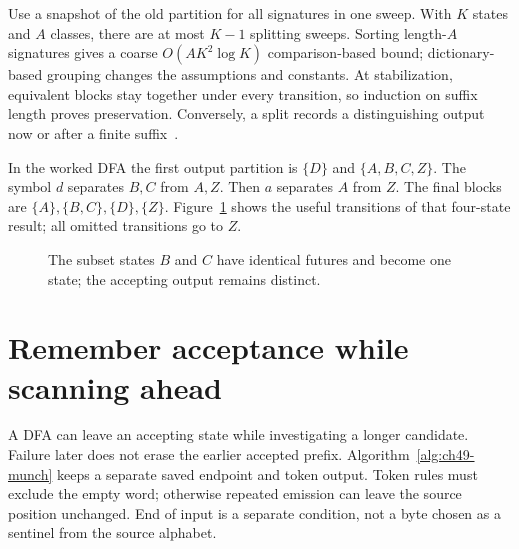 Use a snapshot of the old partition for all signatures in one sweep.
With $K$ states and $A$ classes, there are at most $K-1$ splitting sweeps.
Sorting length-$A$ signatures gives a coarse $O(AK^2\log K)$ comparison-based bound; dictionary-based grouping changes the assumptions and constants.
At stabilization, equivalent blocks stay together under every transition, so induction on suffix length proves preservation.
Conversely, a split records a distinguishing output now or after a finite suffix~\cite{hopcroft-2007-automata}.

In the worked DFA the first output partition is $\{D\}$ and $\{A,B,C,Z\}$.
The symbol $d$ separates $B,C$ from $A,Z$.
Then $a$ separates $A$ from $Z$.
The final blocks are $\{A\},\{B,C\},\{D\},\{Z\}$.
Figure~\ref{fig:ch49-minimal} shows the useful transitions of that four-state result; all omitted transitions go to $Z$.

\begin{figure}[htbp]
\centering
{}
\caption{The subset states $B$ and $C$ have identical futures and become one state; the accepting output remains distinct.}
\label{fig:ch49-minimal}
\end{figure}

\section{Remember acceptance while scanning ahead}
\label{sec:ch49-last-accept}

A DFA can leave an accepting state while investigating a longer candidate.
Failure later does not erase the earlier accepted prefix.
Algorithm~\ref{alg:ch49-munch} keeps a separate saved endpoint and token output.
Token rules must exclude the empty word; otherwise repeated emission can leave the source position unchanged.
End of input is a separate condition, not a byte chosen as a sentinel from the source alphabet.

